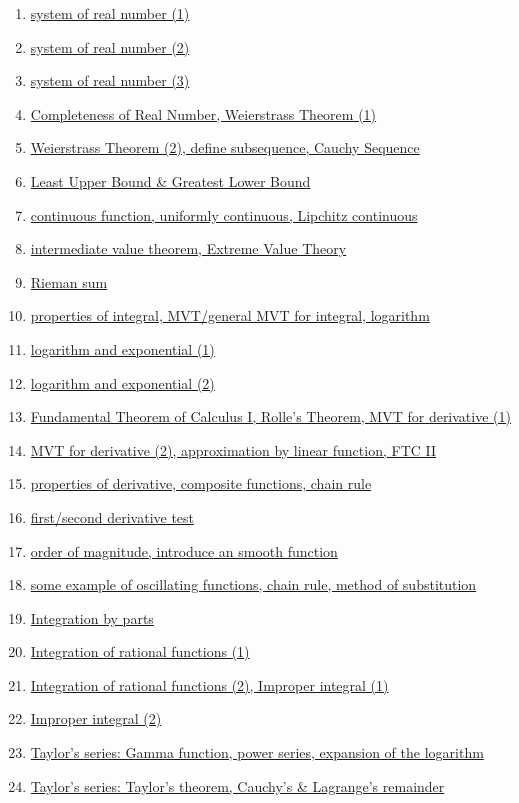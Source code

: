\documentclass[11pt]{article}
\begin{document}
\begin{enumerate}
	\item \href{URL}{system of real number (1)}	%
	\item \href{URL}{system of real number (2)}	%
	\item \href{URL}{system of real number (3)}	%
	\item \href{URL}{Completeness of Real Number, Weierstrass Theorem (1)}	%
	\item \href{URL}{Weierstrass Theorem (2), define subsequence, Cauchy Sequence}	%
	\item \href{URL}{Least Upper Bound \& Greatest Lower Bound}	%
	\item \href{URL}{continuous function, uniformly continuous, Lipchitz continuous}	%
	\item \href{URL}{intermediate value theorem, Extreme Value Theory}	%
	\item \href{URL}{Rieman sum}	%
	\item \href{URL}{properties of integral, MVT/general MVT for integral, logarithm}	%
	\item \href{URL}{logarithm and exponential (1)}	%
	\item \href{URL}{logarithm and exponential (2)}	%
	\item \href{URL}{Fundamental Theorem of Calculus I, Rolle's Theorem, MVT for derivative (1)}	%
	\item \href{URL}{MVT for derivative (2), approximation by linear function, FTC II}	%
	\item \href{URL}{properties of derivative, composite functions, chain rule}	%
	\item \href{URL}{first/second derivative test}	%
	\item \href{URL}{order of magnitude, introduce an smooth function}	%
	\item \href{URL}{some example of oscillating functions, chain rule, method of substitution}	%
	\item \href{URL}{Integration by parts}	%
	\item \href{URL}{Integration of rational functions (1)}	%
	\item \href{URL}{Integration of rational functions (2), Improper integral (1)}	%
	\item \href{URL}{Improper integral (2)}	%
	\item \href{URL}{Taylor's series: Gamma function, power series, expansion of the logarithm}	%
	\item \href{URL}{Taylor's series: Taylor's theorem, Cauchy's \& Lagrange's remainder}	%

\end{enumerate}
\end{document}

